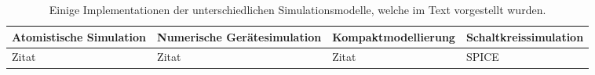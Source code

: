 \begin{table}
\caption[Simulationsmethoden]{Einige Implementationen der unterschiedlichen Simulationsmodelle, welche im Text vorgestellt wurden.}
\begin{tabularx}{\linewidth}{|Y|Y|Y|Y|}
\hline
Atomistische Simulation & Numerische Gerätesimulation & Kompakt\-modellierung & Schaltkreis\-simulation \\
\hline
Zitat & Zitat & Zitat & SPICE \cite{nagel_spice:_1973}\\
\hline
\end{tabularx}
\label{tab:simulationsmethoden}
\end{table}
